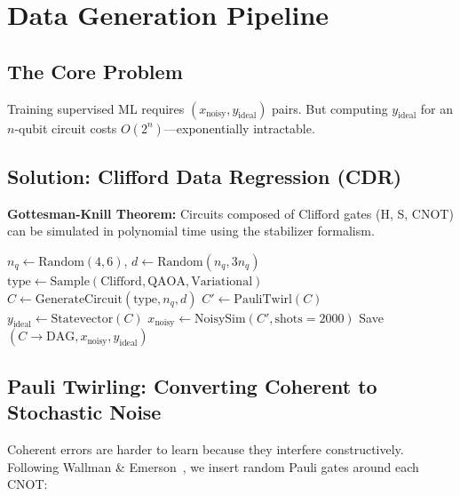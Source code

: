 \documentclass[11pt, a4paper]{article}
\begin{document}
\section{Data Generation Pipeline}
\label{sec:data}

\subsection{The Core Problem}

Training supervised ML requires $(x_{\text{noisy}}, y_{\text{ideal}})$ pairs.
But computing $y_{\text{ideal}}$ for an $n$-qubit circuit costs
$O(2^n)$---exponentially intractable.

\subsection{Solution: Clifford Data Regression (CDR)}

\textbf{Gottesman-Knill Theorem:} Circuits composed of Clifford gates
(H, S, CNOT) can be simulated in polynomial time using the stabilizer
formalism.

\begin{algorithm}[H]
\caption{CDR + Pauli Twirling Data Generation}
\begin{algorithmic}[1]
    \State $n_q \gets \text{Random}(4, 6)$, $d \gets \text{Random}(n_q, 3n_q)$
    \State $\text{type} \gets \text{Sample}(\text{Clifford}, \text{QAOA}, \text{Variational})$
    \State $C \gets \text{GenerateCircuit}(\text{type}, n_q, d)$
    \State $C' \gets \text{PauliTwirl}(C)$ 
    \State $y_{\text{ideal}} \gets \text{Statevector}(C)$ 
    \State $x_{\text{noisy}} \gets \text{NoisySim}(C', \text{shots}=2000)$
    \State Save $(C \rightarrow \text{DAG}, x_{\text{noisy}}, y_{\text{ideal}})$
\EndFor
\end{algorithmic}
\end{algorithm}

\subsection{Pauli Twirling: Converting Coherent to Stochastic Noise}

Coherent errors are harder to learn because they interfere constructively.
Following Wallman \& Emerson~\cite{wallman2016twirling}, we insert random
Pauli gates around each CNOT:
\end{document}
